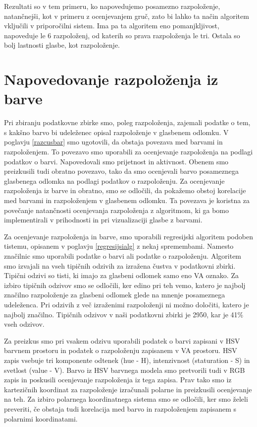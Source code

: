 \documentclass[a4paper, 12pt]{book}
\begin{document}
{Rezultati so v tem primeru, ko napovedujemo posamezno razpoloženje, natančnejši, kot v primeru z ocenjevanjem gruč, zato bi lahko ta način algoritem vključili v priporočilni sistem. Ima pa ta algoritem eno pomanjkljivost, napoveduje le 6 razpoloženj, od katerih so prava razpoloženja le tri. Ostala so bolj lastnosti glasbe, kot razpoloženje.  

\chapter{Napovedovanje razpoloženja iz barve}

Pri zbiranju podatkovne zbirke smo, poleg razpoloženja, zajemali podatke o tem, s kakšno barvo bi udeleženec opisal razpoloženje v glasbenem odlomku. V poglavju \ref{razcusbar} smo ugotovili, da obstaja povezava med barvami in razpoloženjem. To povezavo smo uporabili za ocenjevanje razpoloženja na podlagi podatkov o barvi. Napovedovali smo prijetnost in aktivnost. Obenem smo preizkusili tudi obratno povezavo, tako da smo ocenjevali barvo posameznega glasbenega odlomka na podlagi podatkov o razpoloženju. Za ocenjevanje razpoloženja iz barve in obratno, smo se odločili, da pokažemo obstoj korelacije med barvami in razpoloženjem v glasbenem odlomku. Ta povezava je koristna za povečanje natančnosti ocenjevanja razpoloženja z algoritmom, ki ga bomo implementirali v prihodnosti in pri vizualizaciji glasbe z barvami.

Za ocenjevanje razpoloženja in barve, smo uporabili regresijski algoritem podoben tistemu, opisanem v poglavju \ref{regresijsialg} z nekaj spremembami. Namesto značilnic smo uporabili podatke o barvi ali podatke o razpoloženju. Algoritem smo izvajali na vseh tipičnih odzivih za izražena čustva v podatkovni zbirki. Tipični odzivi so tisti, ki imajo za glasbeni odlomek samo eno VA oznako. Za izbiro tipičnih odzivov smo se odločili, ker edino pri teh vemo, katero je najbolj značilno razpoloženje za glasbeni odlomek glede na mnenje posameznega udeleženca. Pri odzivih z več izraženimi razpoloženji ni možno določiti, katero je najbolj značilno. Tipičnih odzivov v naši podatkovni zbirki je 2950, kar je 41\% vseh odzivov. 

Za preizkus smo pri vsakem odzivu uporabili podatek o barvi zapisani v HSV barvnem prostoru in podatek o razpoloženju zapisanem v VA prostoru. HSV zapis \cite{Sural2002} vsebuje tri komponente odtenek (hue - H), intenzivnost (staturation - S) in svetlost (value - V). Barvo iz HSV barvnega modela smo pretvorili tudi v RGB zapis \cite{susstrunk1999standard} in poskusili ocenjevanje razpoloženja iz tega zapisa. Prav tako smo iz kartezičnih koordinat za razpoloženje izračunali polarne \cite{julier1997consistent} in preizkusili ocenjevanje na teh. Za izbiro polarnega koordinatnega sistema smo se odločili, ker smo želeli preveriti, če obstaja tudi korelacija med barvo in razpoloženjem zapisanem s polarnimi koordinatami. 

}
\end{document}
